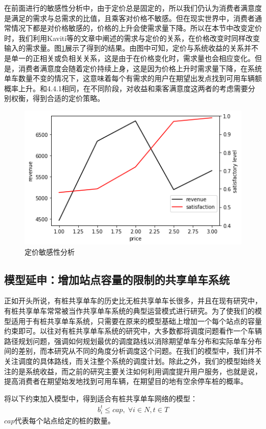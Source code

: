 \documentclass[]{tongjithesis}
\numberwithin{equation}{chapter}
\begin{document}
在前面进行的敏感性分析中，由于定价总是固定的，所以我们仍认为消费者满意度是满足的需求与总需求的比值，且乘客对价格不敏感。但在现实世界中，消费者通常情况下都是对价格敏感的，价格的上升会使需求量下降。所以在本节中改变定价时，我们利用Kaviti等的文章中阐述的需求与定价的关系\cite{kaviti2019assessing}，在价格改变时同样改变输入的需求量。图\ref{sens_price}展示了得到的结果。由图中可知，定价与系统收益的关系并不是单一的正相关或负相关关系，这是由于在价格变化时，需求量也会相应变化。但是，消费者满意度会随着定价持续上身，这是因为价格上升时需求量下降，在系统单车数量不变的情况下，这意味着每个有需求的用户在期望出发点找到可用车辆额概率上升。和4.4.1相同，在不同阶段，对收益和乘客满意度这两者的考虑需要分别权衡，得到合适的定价策略。
\begin{figure}[H]
    \centering
    \includegraphics[width=0.7 \textwidth]{figures_main/sensitivity_price.png}
    \caption{定价敏感性分析}
    \label{sens_price}
\end{figure}

\subsection{模型延申：增加站点容量的限制的共享单车系统}
正如开头所说，有桩共享单车的历史比无桩共享单车长很多，并且在现有研究中，有桩共享单车常常被当作共享单车系统的典型运营模式进行研究。为了使我们的模型适用于有桩共享单车系统，只需要在原来的模型基础上增加一个每个站点的容量约束即可。以往对有桩共享单车系统的研究中，大多数都将调度问题看作一个车辆路径规划问题，强调如何规划最优的调度路线以消除期望单车分布和实际单车分布间的差别\cite{chemla2013bike,liu2016rebalancing,pfrommer2014dynamic}，而本研究从不同的角度分析调度这个问题。在我们的模型中，我们并不关注调度的具体路线，而关注整个系统的调度计划。除此之外，我们的模型始终关注的是系统收益，而之前的研究主要关注如何利用调度提升用户服务，也就是说，提高消费者在期望始发地找到可用车辆，在期望目的地有空余停车桩的概率。

将以下约束加入模型中，得到适合有桩共享单车网络的模型：
\begin{align}
    {b_{i}^{t}}{\leq cap, \;  \forall i\in N, t \in T}
\end{align}
\noindent
$cap$代表每个站点给定的桩的数量。
\end{document}
